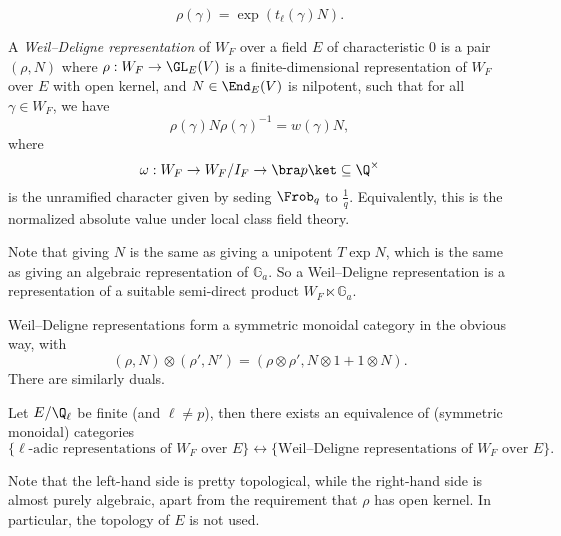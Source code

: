 \documentclass[a4paper]{article}
\renewcommand\G{\mathbb{G}}
\begin{document}
\[
  \rho(\gamma) = \exp (t_\ell(\gamma) N).
\]
\begin{defi}
  A \emph{Weil--Deligne representation} of $W_F$ over a field $E$ of characteristic $0$ is a pair $(\rho, N)$ where $\rho: W_F \to \GL_E(V)$ is a finite-dimensional representation of $W_F$ over $E$ with open kernel, and $N \in \End_E(V)$ is nilpotent, such that for all $\gamma \in W_F$, we have
  \[
    \rho(\gamma) N \rho(\gamma)^{-1} = w(\gamma) N,
  \]
  where
  \[
    \omega: W_F \to W_F/I_F \to \bra p\ket \subseteq \Q^\times
  \]
  is the unramified character given by seding $\Frob_q$ to $\frac{1}{q}$. Equivalently, this is the normalized absolute value under local class field theory.
\end{defi}
Note that giving $N$ is the same as giving a unipotent $T \exp N$, which is the same as giving an algebraic representation of $\G_a$. So a Weil--Deligne representation is a representation of a suitable semi-direct product $W_F \ltimes \G_a$.

Weil--Deligne representations form a symmetric monoidal category in the obvious way, with
\[
  (\rho, N ) \otimes (\rho', N') = (\rho \otimes \rho', N \otimes 1 + 1 \otimes N).
\]
There are similarly duals.

\begin{thm}
  Let $E/\Q_\ell$ be finite (and $\ell \not= p$), then there exists an equivalence of (symmetric monoidal) categories
  \[
    \{\ell\text{-adic representations of $W_F$ over $E$}\} \leftrightarrow \{\text{Weil--Deligne representations of $W_F$ over $E$}\}. 
  \]
\end{thm}
Note that the left-hand side is pretty topological, while the right-hand side is almost purely algebraic, apart from the requirement that $\rho$ has open kernel. In particular, the topology of $E$ is not used.
\end{document}
